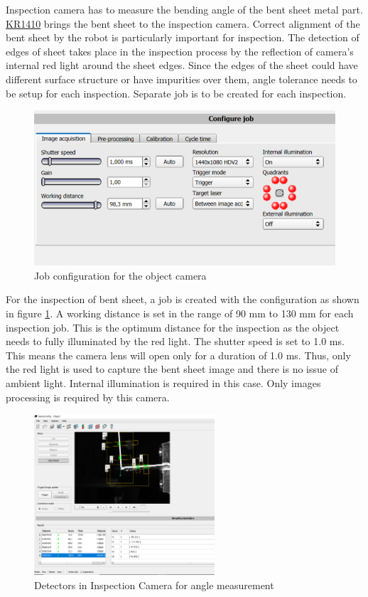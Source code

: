 Inspection camera has to measure the bending angle of the bent sheet metal part. \hyperref[acro:KR]{KR1410} brings the bent sheet to the inspection camera. Correct alignment of the bent sheet by the robot is particularly important for inspection. The detection of edges of sheet takes place in the inspection process by the reflection of camera's internal red light around the sheet edges. Since the edges of the sheet could have different surface structure or have impurities over them, angle tolerance needs to be setup for each inspection. Separate job is to be created for each inspection.

\begin{figure}[h]
    \centering
    \includegraphics[width=\textwidth]{figures/job-configuration-object.png}
    \caption{Job configuration for the object camera}
    \label{fig:job-configuration-object}
\end{figure}

For the inspection of bent sheet, a job is created with the configuration as shown in figure \ref{fig:job-configuration-object}. A working distance is set in the range of 90 mm to 130 mm for each inspection job. This is the optimum distance for the inspection as the object needs to fully illuminated by the red light. The shutter speed is set to 1.0 ms. This means the camera lens will open only for a duration of 1.0 ms. Thus, only the red light is used to capture the bent sheet image and there is no issue of ambient light. Internal illumination is required in this case.
Only images processing is required by this camera.

\begin{figure}[h]
    \centering
    \includegraphics[width=0.6\textwidth]{figures/measurement-detector.png}
    \caption{Detectors in Inspection Camera for angle measurement}
    \label{fig:measurement-detector}
\end{figure}

